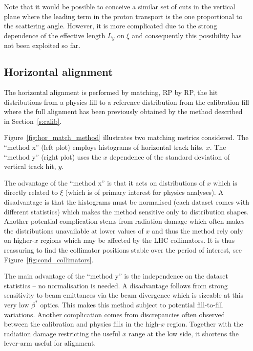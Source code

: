 \documentclass[TOTEM]{cern/cernphprep}
\begin{document}
Note that it would be possible to conceive a similar set of cuts in the vertical plane where the leading term in the proton transport is the one proportional to the scattering angle. However, it is more complicated due to the strong dependence of the effective length $L_y$ on $\xi$ and consequently this possibility has not been exploited so far.

\subsection{Horizontal alignment}
\label{s:phys-horizontal}

The horizontal alignment is performed by matching, RP by RP, the hit distributions from a physics fill to a reference distribution from the calibration fill where the full alignment has been previously obtained by the method described in Section~\ref{s:calib}.

Figure~\ref{fig:hor_match_method} illustrates two matching metrics considered. The ``method x'' (left plot) employs histograms of horizontal track hits, $x$. The ``method y'' (right plot) uses the $x$ dependence of the standard deviation of vertical track hit, $y$.

The advantage of the ``method x'' is that it acts on distributions of $x$ which is directly related to $\xi$ (which is of primary interest for physics analyses). A disadvantage is that the histograms must be normalised (each dataset comes with different statistics) which makes the method sensitive only to distribution shapes. Another potential complication stems from radiation damage which often makes the distributions unavailable at lower values of $x$ and thus the method rely only on higher-$x$ regions which may be affected by the LHC collimators. It is thus reassuring to find the collimator positions stable over the period of interest, see Figure~\ref{fig:cond_collimators}.

The main advantage of the ``method y'' is the independence on the dataset statistics -- no normalisation is needed. A disadvantage follows from strong sensitivity to beam emittances via the beam divergence which is sizeable at this very low $\beta^*$ optics. This makes this method subject to potential fill-to-fill variations. Another complication comes from discrepancies often observed between the calibration and physics fills in the high-$x$ region. Together with the radiation damage restricting the useful $x$ range at the low side, it shortens the lever-arm useful for alignment.
\end{document}
